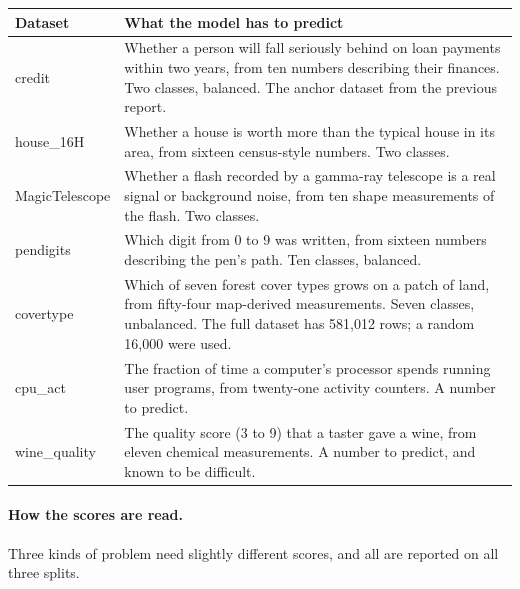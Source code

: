\documentclass[11pt,a4paper]{article}
\begin{document}
\begin{table}[H]\centering\small
\begin{tabular}{lp{11.2cm}}
\toprule
\textbf{Dataset} & \textbf{What the model has to predict}\\
\midrule
credit & Whether a person will fall seriously behind on loan payments within two years, from ten numbers describing their finances. Two classes, balanced. The anchor dataset from the previous report.\\
house\_16H & Whether a house is worth more than the typical house in its area, from sixteen census-style numbers. Two classes.\\
MagicTelescope & Whether a flash recorded by a gamma-ray telescope is a real signal or background noise, from ten shape measurements of the flash. Two classes.\\
pendigits & Which digit from 0 to 9 was written, from sixteen numbers describing the pen's path. Ten classes, balanced.\\
covertype & Which of seven forest cover types grows on a patch of land, from fifty-four map-derived measurements. Seven classes, unbalanced. The full dataset has 581,012 rows; a random 16,000 were used.\\
cpu\_act & The fraction of time a computer's processor spends running user programs, from twenty-one activity counters. A number to predict.\\
wine\_quality & The quality score (3 to 9) that a taster gave a wine, from eleven chemical measurements. A number to predict, and known to be difficult.\\
\bottomrule
\end{tabular}
\end{table}

\begin{table}[H]\centering\small
\tabsizes
\caption{Sizes after the split, the width of the tree encoding each forest
produced, and the best of the three reference tree models fitted on the raw
features of the same split. ``Kind'' names the type of problem.}
\end{table}

\paragraph{How the scores are read.} Three kinds of problem need slightly
different scores, and all are reported on all three splits.
\end{document}
